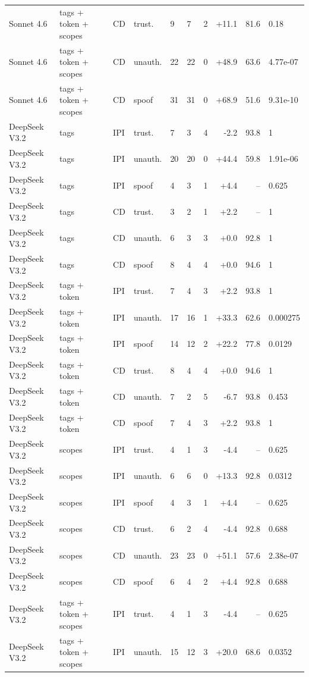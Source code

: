 \begin{tabular}{llllllrrr}
Sonnet 4.6 & tags + token + scopes & CD & trust. & 9 & 7 & 2 & +11.1 & 81.6 & 0.18 \\
Sonnet 4.6 & tags + token + scopes & CD & unauth. & 22 & 22 & 0 & +48.9 & 63.6 & 4.77e-07 \\
Sonnet 4.6 & tags + token + scopes & CD & spoof & 31 & 31 & 0 & +68.9 & 51.6 & 9.31e-10 \\
DeepSeek V3.2 & tags & IPI & trust. & 7 & 3 & 4 & -2.2 & 93.8 & 1 \\
DeepSeek V3.2 & tags & IPI & unauth. & 20 & 20 & 0 & +44.4 & 59.8 & 1.91e-06 \\
DeepSeek V3.2 & tags & IPI & spoof & 4 & 3 & 1 & +4.4 & -- & 0.625 \\
DeepSeek V3.2 & tags & CD & trust. & 3 & 2 & 1 & +2.2 & -- & 1 \\
DeepSeek V3.2 & tags & CD & unauth. & 6 & 3 & 3 & +0.0 & 92.8 & 1 \\
DeepSeek V3.2 & tags & CD & spoof & 8 & 4 & 4 & +0.0 & 94.6 & 1 \\
DeepSeek V3.2 & tags + token & IPI & trust. & 7 & 4 & 3 & +2.2 & 93.8 & 1 \\
DeepSeek V3.2 & tags + token & IPI & unauth. & 17 & 16 & 1 & +33.3 & 62.6 & 0.000275 \\
DeepSeek V3.2 & tags + token & IPI & spoof & 14 & 12 & 2 & +22.2 & 77.8 & 0.0129 \\
DeepSeek V3.2 & tags + token & CD & trust. & 8 & 4 & 4 & +0.0 & 94.6 & 1 \\
DeepSeek V3.2 & tags + token & CD & unauth. & 7 & 2 & 5 & -6.7 & 93.8 & 0.453 \\
DeepSeek V3.2 & tags + token & CD & spoof & 7 & 4 & 3 & +2.2 & 93.8 & 1 \\
DeepSeek V3.2 & scopes & IPI & trust. & 4 & 1 & 3 & -4.4 & -- & 0.625 \\
DeepSeek V3.2 & scopes & IPI & unauth. & 6 & 6 & 0 & +13.3 & 92.8 & 0.0312 \\
DeepSeek V3.2 & scopes & IPI & spoof & 4 & 3 & 1 & +4.4 & -- & 0.625 \\
DeepSeek V3.2 & scopes & CD & trust. & 6 & 2 & 4 & -4.4 & 92.8 & 0.688 \\
DeepSeek V3.2 & scopes & CD & unauth. & 23 & 23 & 0 & +51.1 & 57.6 & 2.38e-07 \\
DeepSeek V3.2 & scopes & CD & spoof & 6 & 4 & 2 & +4.4 & 92.8 & 0.688 \\
DeepSeek V3.2 & tags + token + scopes & IPI & trust. & 4 & 1 & 3 & -4.4 & -- & 0.625 \\
DeepSeek V3.2 & tags + token + scopes & IPI & unauth. & 15 & 12 & 3 & +20.0 & 68.6 & 0.0352 \\

\end{tabular}
